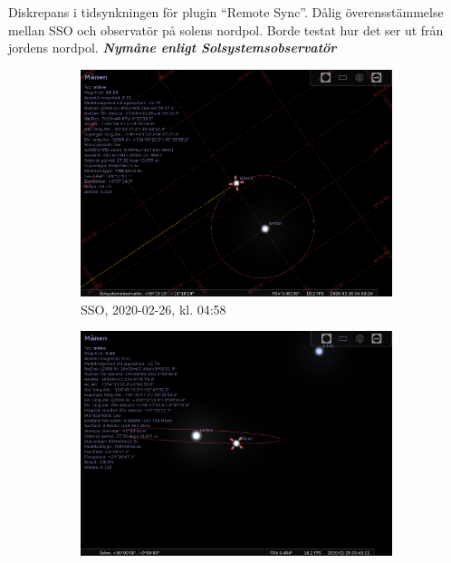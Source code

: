 \documentclass[./exercises.tex]{subfiles}
\begin{document}
\begin{itemize}
Diskrepans i tidsynkningen för plugin ``Remote Sync''.
Dålig överensstämmelse mellan SSO och observatör på solens nordpol.
Borde testat hur det ser ut från jordens nordpol.
\newpage
\textit{\textbf{Nymåne enligt Solsystemsobservatör}}
\begin{figure}[H]
     \centering
     \begin{subfigure}[b]{0.45\textwidth}
         \centering
         \includegraphics[width=\textwidth]{Stellarium1/RealNewMoon/stellarium-000.png}
         \caption{SSO, 2020-02-26, kl. 04:58}
         \label{fig:y equals x}
     \end{subfigure}
     \hfill
     \begin{subfigure}[b]{0.45\textwidth}
         \centering
         \includegraphics[width=\textwidth]{Stellarium1/RealNewMoon/stellarium-001.png}

\end{subfigure}
\end{figure}
\end{itemize}
\end{document}
